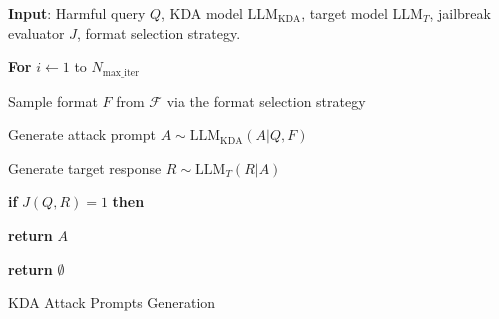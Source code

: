 \vspace{-2mm}
\begin{algorithm}[h]
\textbf{Input}: Harmful query $Q$, KDA model $\text{LLM}_{\text{KDA}}$, target model $\text{LLM}_{T}$, jailbreak evaluator $J$, format selection strategy.


\textbf{For} $i \leftarrow 1$ to $N_{\text{max\_iter}}$

\quad Sample format $F$ from $\mathcal{F}$ via the format selection strategy

\quad Generate attack prompt $A \sim \text{LLM}_{\text{KDA}}(A| Q,F)$

\quad Generate target response $R \sim \text{LLM}_{T}(R|A)$ 

\quad \textbf{if} $J(Q,R) = 1$ \textbf{then}

\quad \quad \textbf{return} $A$

\textbf{return} $\emptyset$ 

\caption{KDA Attack Prompts Generation}\label{alg:kda}
\end{algorithm}
\vspace{-2mm}















